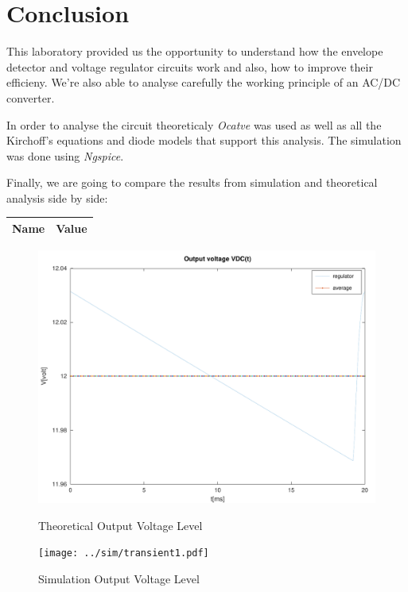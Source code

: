 \section{Conclusion}
\label{sec:conclusion}

This laboratory provided us the opportunity to understand how the envelope detector and voltage regulator circuits work and also, how to improve their efficieny. We're also able to analyse carefully the working principle of an AC/DC converter. \par
In order to analyse the circuit theoreticaly \textit{Ocatve} was used as well as all the Kirchoff's equations and diode models that support this analysis. 
The simulation was done using \textit{Ngspice}. \par
Finally, we are going to compare the results from simulation and theoretical analysis side by side: \par

\begin{center}
  \begin{tabular}{ | c | c | }
    \hline    
    {\bf Name} & {\bf Value} \\ \hline
    
    \hline
  \end{tabular}
\end{center}

\begin{figure}[H]
      \includegraphics[width=\linewidth]{../mat/outputdc.pdf}
      \caption{Theoretical Output Voltage Level}
    \endminipage\hfill
      \texttt{[image: ../sim/transient1.pdf]}
      \caption{Simulation Output Voltage Level}
    \endminipage\hfill
\end{figure}

